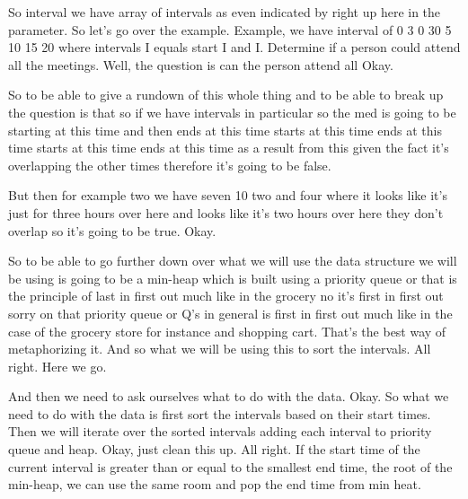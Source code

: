 \expandafter\def\csname sourceexcerpt@32\endcsname{%
So interval we have array of intervals as even indicated by right up here in the
parameter. So let's go over the example. Example, we have interval of 0 3 0 30 5 10 15
20 where intervals I equals start I and I. Determine if a person could attend all the
meetings. Well, the question is can the person attend all Okay.

So to be able to give a rundown of this whole thing and to be able to break up the
question is that so if we have intervals in particular so the med is going to be
starting at this time and then ends at this time starts at this time ends at this time
starts at this time ends at this time as a result from this given the fact it's
overlapping the other times therefore it's going to be false.

But then for example two we have seven 10 two and four where it looks like it's just
for three hours over here and looks like it's two hours over here they don't overlap
so it's going to be true. Okay.

So to be able to go further down over what we will use the data structure we will be
using is going to be a min-heap which is built using a priority queue or that is the
principle of last in first out much like in the grocery no it's first in first out
sorry on that priority queue or Q's in general is first in first out much like in the case
of the grocery store for instance and shopping cart. That's the best way of
metaphorizing it. And so what we will be using this to sort the intervals. All right.
Here we go.

And then we need to ask ourselves what to do with the data. Okay. So what we need to
do with the data is first sort the intervals based on their start times. Then we will
iterate over the sorted intervals adding each interval to priority queue and heap. Okay,
just clean this up. All right. If the start time of the current interval is greater
than or equal to the smallest end time, the root of the min-heap, we can use the same
room and pop the end time from min heat.
}


